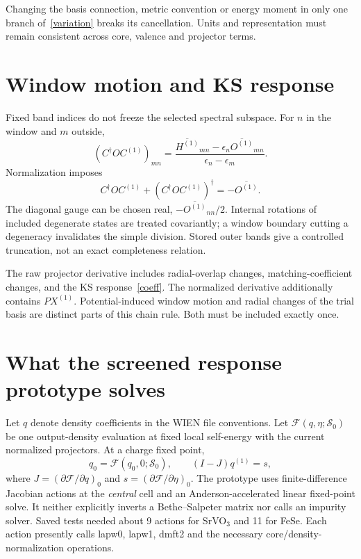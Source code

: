 \documentclass[11pt]{article}
\newcommand{\Sig}{\mathcal S}
\begin{document}
Changing the basis connection, metric convention or energy moment in only one branch of~\eqref{variation} breaks its cancellation. Units and representation must remain consistent across core, valence and projector terms.

\section{Window motion and KS response}
Fixed band indices do not freeze the selected spectral subspace. For $n$ in the window and $m$ outside,
\begin{equation}\label{coeff}
(C^\dagger O C^{(1)})_{mn}=
\frac{\overline{H^{(1)}}_{mn}-\epsilon_n\overline{O^{(1)}}_{mn}}
{\epsilon_n-\epsilon_m}.
\end{equation}
Normalization imposes
\begin{equation}
C^\dagger O C^{(1)}+(C^\dagger O C^{(1)})^\dagger=-\overline{O^{(1)}}.
\end{equation}
The diagonal gauge can be chosen real, $-\overline{O^{(1)}}_{nn}/2$. Internal rotations of included degenerate states are treated covariantly; a window boundary cutting a degeneracy invalidates the simple division. Stored outer bands give a controlled truncation, not an exact completeness relation.

The raw projector derivative includes radial-overlap changes, matching-coefficient changes, and the KS response~\eqref{coeff}. The normalized derivative additionally contains $PX^{(1)}$. Potential-induced window motion and radial changes of the trial basis are distinct parts of this chain rule. Both must be included exactly once.

\section{What the screened response prototype solves}
Let $q$ denote density coefficients in the WIEN file conventions. Let $\mathcal F(q,\eta;\Sig_0)$ be one output-density evaluation at fixed local self-energy with the current normalized projectors. At a charge fixed point,
\begin{equation}
q_0=\mathcal F(q_0,0;\Sig_0),\qquad (I-J)q^{(1)}=s,
\end{equation}
where $J=(\partial\mathcal F/\partial q)_0$ and $s=(\partial\mathcal F/\partial\eta)_0$. The prototype uses finite-difference Jacobian actions at the \emph{central} cell and an Anderson-accelerated linear fixed-point solve. It neither explicitly inverts a Bethe--Salpeter matrix nor calls an impurity solver. Saved tests needed about 9 actions for SrVO$_3$ and 11 for FeSe. Each action presently calls lapw0, lapw1, dmft2 and the necessary core/density-normalization operations.
\end{document}
